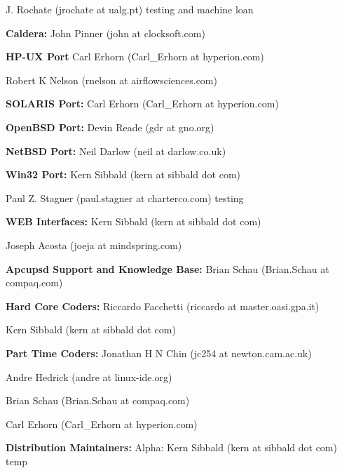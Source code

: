 {{{{{{{{{{{{{{{{{\begin{description}
J. Rochate (jrochate at ualg.pt) testing and machine loan  

\item {\bf Caldera:}
John Pinner (john at clocksoft.com)  

\item {\bf HP-UX Port}
Carl Erhorn (Carl\_Erhorn at hyperion.com)  

Robert K Nelson (rnelson at airflowsciences.com)  

\item {\bf SOLARIS Port:}
Carl Erhorn (Carl\_Erhorn at hyperion.com)  

\item {\bf OpenBSD Port:}
Devin Reade (gdr at gno.org)  

\item {\bf NetBSD Port:}
Neil Darlow (neil at darlow.co.uk)  

\item {\bf Win32 Port:}
Kern Sibbald (kern at sibbald dot com)  

Paul Z. Stagner (paul.stagner at charterco.com) testing  

\item {\bf WEB Interfaces:}
Kern Sibbald (kern at sibbald dot com)  

Joseph Acosta (joeja at mindspring.com)  

\item {\bf Apcupsd Support and Knowledge Base:}
Brian Schau (Brian.Schau at compaq.com)  

\item {\bf Hard Core Coders:}
Riccardo Facchetti (riccardo at master.oasi.gpa.it)  

Kern Sibbald (kern at sibbald dot com)  

\item {\bf Part Time Coders:}
Jonathan H N Chin (jc254 at newton.cam.ac.uk)  

Andre Hedrick (andre at linux-ide.org)  

Brian Schau (Brian.Schau at compaq.com)  

Carl Erhorn (Carl\_Erhorn at hyperion.com)  

\item {\bf Distribution Maintainers:}
Alpha: Kern Sibbald (kern at sibbald dot com) temp  


\end{description}}}}}}}}}}}}}}}}}}
